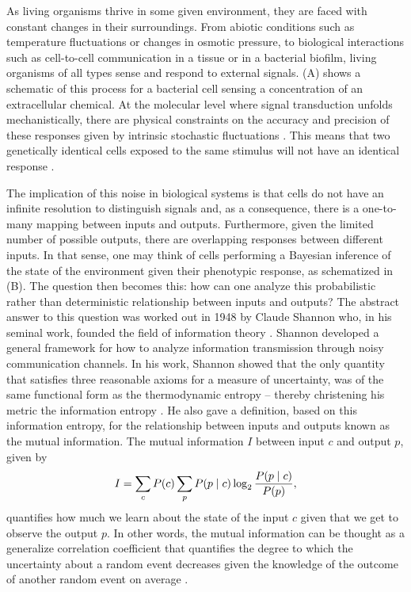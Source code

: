As living organisms thrive in some given environment, they are faced with
constant changes in their surroundings. From abiotic conditions such as
temperature fluctuations or changes in osmotic pressure, to biological
interactions such as cell-to-cell communication in a tissue or in a bacterial
biofilm, living organisms of all types sense and respond to external signals.
(A) shows a schematic of this process for a bacterial cell
sensing a concentration of an extracellular chemical. At the molecular level
where signal transduction unfolds mechanistically, there are physical
constraints on the accuracy and precision of these responses given by intrinsic
stochastic fluctuations \cite{Nemenman2010}. This means that two genetically
identical cells exposed to the same stimulus will not have an identical
response \cite{Eldar2010}.

The implication of this noise in biological systems is that cells do not have
an infinite resolution to distinguish signals and, as a consequence, there is a
one-to-many mapping between inputs and outputs. Furthermore, given the limited
number of possible outputs, there are overlapping responses between different
inputs. In that sense, one may think of cells performing a Bayesian inference
of the state of the environment given their phenotypic response, as schematized
in (B). The question then becomes this: how can one analyze
this probabilistic rather than deterministic relationship between inputs and
outputs? The abstract answer to this question was worked out in 1948 by Claude
Shannon who, in his seminal work, founded the field of information theory
\cite{Shannon1948}. Shannon developed a general framework for how to analyze
information transmission through noisy communication channels. In his work,
Shannon showed that the only quantity that satisfies three reasonable axioms
for a measure of uncertainty, was of the same functional form as the
thermodynamic entropy -- thereby christening his metric the information entropy
\cite{MacKay2003}. He also gave a definition, based on this information
entropy, for the relationship between inputs and outputs known as the mutual
information. The mutual information $I$ between input $c$ and output $p$, given
by
\begin{equation}
  I = \sum_c P(c) \sum_p P(p \mid c) \log_2 {P(p \mid c) \over P(p)},
	\label{eq_mutual_info}
\end{equation}
quantifies how much we learn about the state of the input $c$ given that we get
to observe the output $p$. In other words, the mutual information can be
thought as a generalize correlation coefficient that quantifies the degree to
which the uncertainty about a random event decreases given the knowledge of the
outcome of another random event on average \cite{Kinney2010}.

